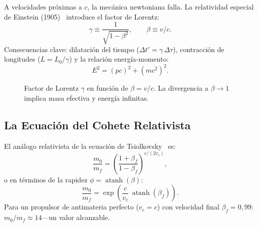 \documentclass[12pt,a4paper]{article}
\DeclareMathOperator{\atanh}{atanh}
\begin{document}
A velocidades próximas a $c$, la mecánica newtoniana falla. La relatividad
especial de Einstein (1905)~\citep{Einstein1905} introduce el factor de Lorentz:
\begin{equation}
  \gamma \equiv \frac{1}{\sqrt{1-\beta^2}}, \qquad \beta \equiv v/c.
\end{equation}
Consecuencias clave: dilatación del tiempo ($\Delta t' = \gamma\,\Delta\tau$),
contracción de longitudes ($L = L_0/\gamma$) y la relación energía-momento:
\begin{equation}
  E^2 = (pc)^2 + (mc^2)^2.
\end{equation}

\begin{figure}[ht]
  \centering
  \caption{Factor de Lorentz $\gamma$ en función de $\beta = v/c$.
           La divergencia a $\beta \to 1$ implica masa efectiva y energía infinitas.}
  \label{fig:lorentz_es}
\end{figure}

\subsection{La Ecuación del Cohete Relativista}

El análogo relativista de la ecuación de Tsiolkovsky~\citep{Ackeret1946} es:
\begin{equation}
  \boxed{\frac{m_0}{m_f} = \left(\frac{1+\beta_f}{1-\beta_f}\right)^{c/(2v_e)},}
\end{equation}
o en términos de la rapidez $\phi = \atanh(\beta)$:
\begin{equation}
  \frac{m_0}{m_f} = \exp\!\left(\frac{c}{v_e}\,\atanh(\beta_f)\right).
\end{equation}
Para un propulsor de antimateria perfecto ($v_e = c$) con velocidad final
$\beta_f = 0{,}99$: $m_0/m_f \approx 14$---un valor alcanzable.
\end{document}
